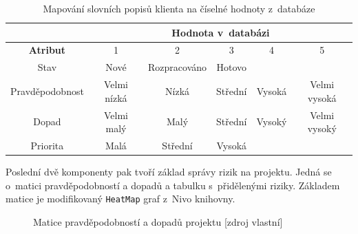 \begin{table}[h]
\begin{tabular}{|c|c|c|c|c|c|}
\hline
                 & \multicolumn{5}{c|}{\textbf{Hodnota v~databázi}}             \\ \hline
\textbf{Atribut} & 1           & 2            & 3       & 4      & 5            \\ \hline
Stav             & Nové        & Rozpracováno & Hotovo  &        &              \\ \hline
Pravděpodobnost  & Velmi nízká & Nízká        & Střední & Vysoká & Velmi vysoká \\ \hline
Dopad            & Velmi malý  & Malý         & Střední & Vysoký & Velmi vysoký \\ \hline
Priorita         & Malá        & Střední      & Vysoká  &        &              \\ \hline
\end{tabular}
\caption{Mapování slovních popisů klienta na číselné hodnoty z~databáze}
\label{tableMaps}
\end{table}

Poslední dvě komponenty pak tvoří základ správy rizik na projektu. Jedná se o~matici pravděpodobností a dopadů a tabulku s~přidělenými riziky. Základem matice je modifikovaný \texttt{HeatMap} graf z~Nivo knihovny.

    \begin{figure}[!h]
    \begin{center}
    \caption{Matice pravděpodobností a dopadů projektu [zdroj vlastní]}
    \label{maticePravdDopad}
    \end{center}
    \end{figure}

